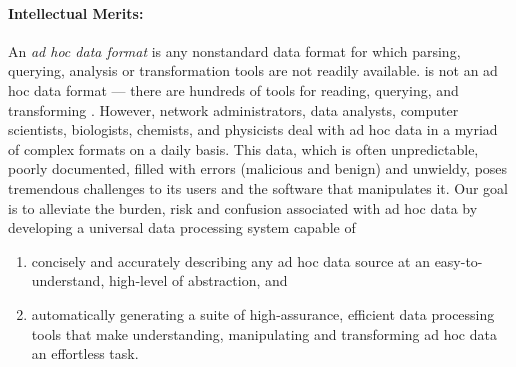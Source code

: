 
\paragraph*{Intellectual Merits:} 
An {\em ad hoc data format} is any nonstandard data format for which
parsing, querying, analysis or transformation tools are not readily
available.  \xml{} is not an ad hoc data format --- there are hundreds
of tools for reading, querying, and transforming \xml{}.  However,
network administrators,
data analysts, computer scientists,
biologists, chemists, and physicists deal with ad hoc
data in a myriad of complex formats on a daily basis.
This data, which is often unpredictable, poorly documented,
filled with errors (malicious and benign) and unwieldy,
poses tremendous challenges to its users and the software
that manipulates it.  
Our goal is to alleviate the burden, risk and confusion associated
with ad hoc data by developing a universal data processing system
capable of 

\begin{enumerate}
\item concisely and accurately describing any ad hoc data source at an 
easy-to-understand, high-level of abstraction, and
\item automatically generating a suite of high-assurance,
efficient data processing tools that make understanding, manipulating 
and transforming ad hoc data an effortless task.
\end{enumerate}


